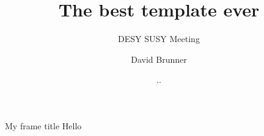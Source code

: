 \documentclass{beamer}
\title{The best template ever}
\subtitle{DESY SUSY Meeting}
\author[David Brunner]{David Brunner}
\institute[DESY]{Deutsches Elektronen-Synchrotron (DESY)}
\date{\the\day.\the\month.\the\year}
\begin{document}
{
    \begin{frame}
      \titlepage
    \end{frame}
}
\addtocounter{framenumber}{-1}

\begin{frame}{My frame title}
    Hello
\end{frame}
\end{document}
